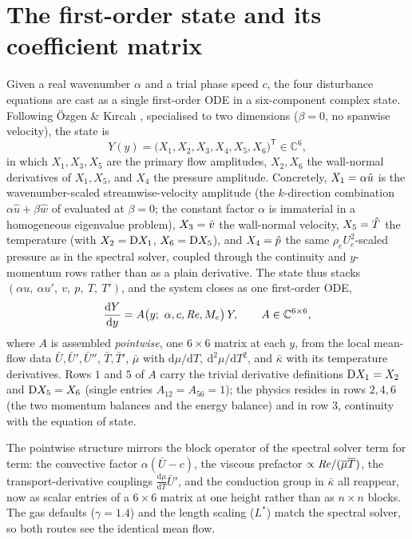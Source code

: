 \documentclass[11pt]{article}
\begin{document}
\section{The first-order state and its coefficient matrix}\label{sec:shoot-system}
Given a real wavenumber $\alpha$ and a trial phase speed $c$, the four disturbance equations are cast
as a single first-order ODE in a six-component complex state. Following \"Ozgen \& K{\i}rcal{\i}
\cite[Eqs.~22--28]{ozgen2008}, specialised to two dimensions ($\beta=0$, no spanwise velocity), the
state is
\begin{equation}\label{eq:state}
  Y(y)=\big(X_1,X_2,X_3,X_4,X_5,X_6\big)^{\mathsf T}\in\mathbb C^{6},
\end{equation}
in which $X_1,X_3,X_5$ are the primary flow amplitudes, $X_2,X_6$ the wall-normal derivatives of
$X_1,X_5$, and $X_4$ the pressure amplitude. Concretely, $X_1=\alpha\hat{u}$ is the wavenumber-scaled
streamwise-velocity amplitude (the $k$-direction combination $\alpha\hat u+\beta\hat w$ of
\cite{ozgen2008} evaluated at $\beta=0$; the constant factor $\alpha$ is immaterial in a homogeneous
eigenvalue problem), $X_3=\hat{v}$ the wall-normal velocity, $X_5=\hat{T}$ the temperature (with
$X_2=\mathrm{D} X_1$, $X_6=\mathrm{D} X_5$), and $X_4=\hat{p}$ the same $\rho_eU_e^2$-scaled pressure as in the
spectral solver, coupled through the continuity and $y$-momentum rows rather than as a plain
derivative. The state thus stacks $(\alpha u,\ \alpha u',\ v,\ p,\ T,\ T')$, and the system closes
as one first-order ODE,
\begin{equation}\label{eq:foode}
  \frac{\mathrm d Y}{\mathrm d y}=A\big(y;\ \alpha,c,\Ree,\Mae\big)\,Y,\qquad A\in\mathbb C^{6\times6},
\end{equation}
where $A$ is assembled \emph{pointwise}, one $6\times6$ matrix at each $y$, from the local
mean-flow data $\bar U,\bar U',\bar U''$, $\bar T,\bar T'$, $\bar\mu$ with
$\mathrm d\mu/\mathrm dT,\ \mathrm d^2\mu/\mathrm dT^2$, and $\bar\kappa$ with its temperature
derivatives. Rows $1$
and $5$ of $A$ carry the trivial derivative definitions $\mathrm{D} X_1=X_2$ and $\mathrm{D} X_5=X_6$ (single
entries $A_{12}=A_{56}=1$); the physics resides in rows $2,4,6$ (the two momentum balances and the
energy balance) and in row $3$, continuity with the equation of state.

The pointwise structure mirrors the block operator of the spectral solver term for term: the
convective factor $\alpha(\bar U-c)$, the viscous prefactor $\propto\mathit{Re}/(\overline{\mu}\overline{T})$, the
transport-derivative couplings $\tfrac{\mathrm d\mu}{\mathrm dT}\bar U'$, and the conduction group
in $\bar\kappa$ all reappear, now as scalar entries of a $6\times6$ matrix at one height rather
than as $n\times n$ blocks. The gas defaults ($\gamma=1.4$) and the length scaling ($L^*$) match
the spectral solver, so both routes see the identical mean flow.
\end{document}
